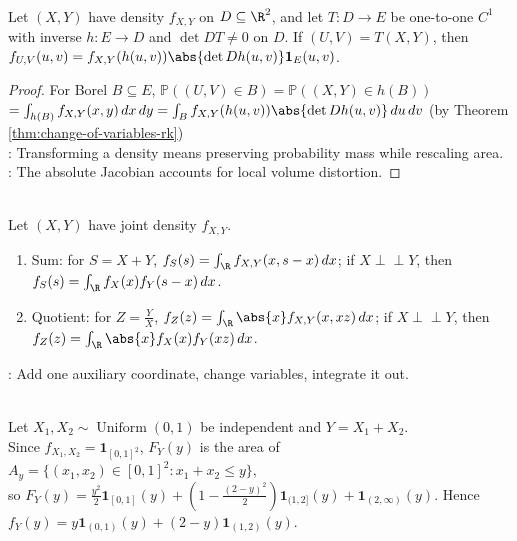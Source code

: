 \begin{proposition} \label{prop:two-dimensional-density-change-of-variables} \\
Let $(X,Y)$ have density $f_{X,Y}$ on $D\subseteq\R^2$, and let $T:D\to E$ be one-to-one $C^1$ with inverse $h:E\to D$ and $\det DT\neq0$ on $D$. If $(U,V)=T(X,Y)$, then $f_{U,V}(u,v)=f_{X,Y}(h(u,v))\abs{\det Dh(u,v)}\mathbf{1}_E(u,v)$.
\begin{proof}
For Borel $B\subseteq E$, $\mathbb{P}((U,V)\in B)=\mathbb{P}((X,Y)\in h(B))$\\
$=\int_{h(B)}f_{X,Y}(x,y)\,dx\,dy=\int_B f_{X,Y}(h(u,v))\abs{\det Dh(u,v)}\,du\,dv$ (by Theorem \ref{thm:change-of-variables-rk})\\
: Transforming a density means preserving probability mass while rescaling area.\\
: The absolute Jacobian accounts for local volume distortion.
\end{proof}
\end{proposition}

\begin{example} \label{ex:sum-and-quotient-density-formulas} \\
Let $(X,Y)$ have joint density $f_{X,Y}$.
\begin{enumerate}[label=(\roman*)]
\setlength{\itemsep}{0pt}
\item Sum: for $S=X+Y$, $f_S(s)=\int_\R f_{X,Y}(x,s-x)\,dx$; if $X\perp\!\!\!\perp Y$, then $f_S(s)=\int_\R f_X(x)f_Y(s-x)\,dx$.
\item Quotient: for $Z=\frac{Y}{X}$, $f_Z(z)=\int_\R\abs{x}f_{X,Y}(x,xz)\,dx$; if $X\perp\!\!\!\perp Y$, then $f_Z(z)=\int_\R\abs{x}f_X(x)f_Y(xz)\,dx$.
\end{enumerate}
: Add one auxiliary coordinate, change variables, integrate it out.
\end{example}

\begin{example} \label{ex:sum-of-two-independent-uniforms} \\
Let $X_1,X_2\sim\operatorname{Uniform}(0,1)$ be independent and $Y=X_1+X_2$.\\
Since $f_{X_1,X_2}=\mathbf{1}_{[0,1]^2}$, $F_Y(y)$ is the area of $A_y=\{(x_1,x_2)\in[0,1]^2:x_1+x_2\leq y\}$,\\
so $F_Y(y)=\frac{y^2}{2}\mathbf{1}_{[0,1]}(y)+(1-\frac{(2-y)^2}{2})\mathbf{1}_{(1,2]}(y)+\mathbf{1}_{(2,\infty)}(y)$. Hence $f_Y(y)=y\mathbf{1}_{(0,1)}(y)+(2-y)\mathbf{1}_{(1,2)}(y)$.
\end{example}

